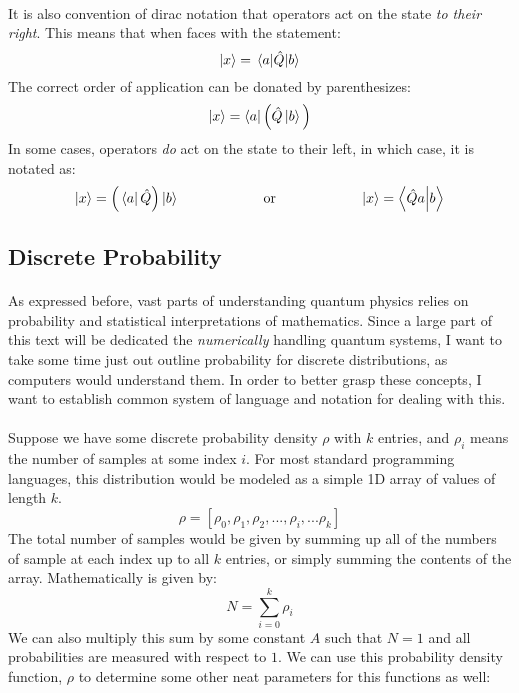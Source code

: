 \documentclass[12pt,letterpaper]{book}
\begin{document}
\paragraph*{}It is also convention of dirac notation that operators act on the state \textit{to their right}. This means that when faces with the statement:
\begin{equation}
\ket{x} = \mel{a}{\hat{Q}}{b}
\end{equation}
The correct order of application can be donated by parenthesizes:
\begin{equation}
\ket{x} = \bra{a}\Big( \hat{Q}\ket{b} \Big)
\end{equation}
In some cases, operators \textit{do} act on the state to their left, in which case, it is notated as:
\begin{equation}
\ket{x} = \Big(\bra{a}\hat{Q}\Big)\ket{b} 
\text{\hspace{2cm} or \hspace{2cm}}
\ket{x} = \braket{\hat{Q}a}{b}
\end{equation}


\subsection*{Discrete Probability}

\paragraph*{}As expressed before, vast parts of understanding quantum physics relies on probability and statistical interpretations of mathematics. Since a large part of this text will be dedicated the \textit{numerically} handling quantum systems, I want to take some time just out outline probability for discrete distributions, as computers would understand them. In order to better grasp these concepts, I want to establish common system of language and notation for dealing with this.

\paragraph*{}Suppose we have some discrete probability density $\rho$ with $k$ entries, and $\rho_i$ means the number of samples at some index $i$. For most standard programming languages, this distribution would be modeled as a simple 1D array of values of length $k$.
\begin{equation}
\label{rho}
\rho = [ \rho_0 , \rho_1 , \rho_2 , ... , \rho_i , ... \rho_k ]
\end{equation}
The total number of samples would be given by summing up all of the numbers of sample at each index up to all $k$ entries, or simply summing the contents of the array. Mathematically is given by:
\begin{equation}
\label{total disc samples}
N = \sum_{i=0}^{k}\rho_i
\end{equation}
We can also multiply this sum by some constant $A$ such that $N = 1$ and all probabilities are measured with respect to $1$. We can use this probability density function, $\rho$ to determine some other neat parameters for this functions as well:
\end{document}
